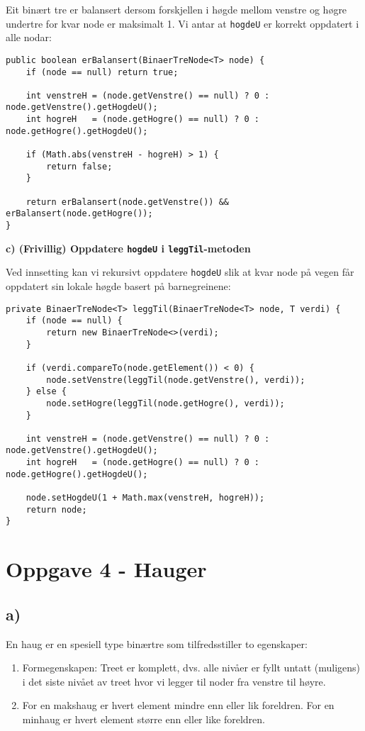 \documentclass[12pt]{article}
\begin{document}
\noindent
Eit binært tre er balansert dersom forskjellen i høgde mellom venstre og høgre undertre for kvar node er maksimalt 1. Vi antar at \texttt{hogdeU} er korrekt oppdatert i alle nodar:

{\small
\begin{verbatim}
public boolean erBalansert(BinaerTreNode<T> node) {
    if (node == null) return true;

    int venstreH = (node.getVenstre() == null) ? 0 : node.getVenstre().getHogdeU();
    int hogreH   = (node.getHogre() == null) ? 0 : node.getHogre().getHogdeU();

    if (Math.abs(venstreH - hogreH) > 1) {
        return false;
    }

    return erBalansert(node.getVenstre()) && erBalansert(node.getHogre());
}
\end{verbatim}
}

\noindent
\textbf{c) (Frivillig) Oppdatere \texttt{hogdeU} i \texttt{leggTil}-metoden}

\noindent
Ved innsetting kan vi rekursivt oppdatere \texttt{hogdeU} slik at kvar node på vegen får oppdatert sin lokale høgde basert på barnegreinene:

{\small
\begin{verbatim}
private BinaerTreNode<T> leggTil(BinaerTreNode<T> node, T verdi) {
    if (node == null) {
        return new BinaerTreNode<>(verdi);
    }

    if (verdi.compareTo(node.getElement()) < 0) {
        node.setVenstre(leggTil(node.getVenstre(), verdi));
    } else {
        node.setHogre(leggTil(node.getHogre(), verdi));
    }

    int venstreH = (node.getVenstre() == null) ? 0 : node.getVenstre().getHogdeU();
    int hogreH   = (node.getHogre() == null) ? 0 : node.getHogre().getHogdeU();

    node.setHogdeU(1 + Math.max(venstreH, hogreH));
    return node;
}
\end{verbatim}
}

\break
\section*{Oppgave 4 - Hauger}
\subsection*{a)}
En haug er en spesiell type binærtre som tilfredsstiller to egenskaper: 
\begin{enumerate}
    \item Formegenskapen: Treet er komplett, dvs. alle nivåer er fyllt untatt (muligens)
        i det siste nivået av treet hvor vi legger til noder fra venstre til høyre.
    \item For en makshaug er hvert element mindre enn eller lik foreldren. For en minhaug
        er hvert element større enn eller like foreldren.
\end{enumerate}
\end{document}
